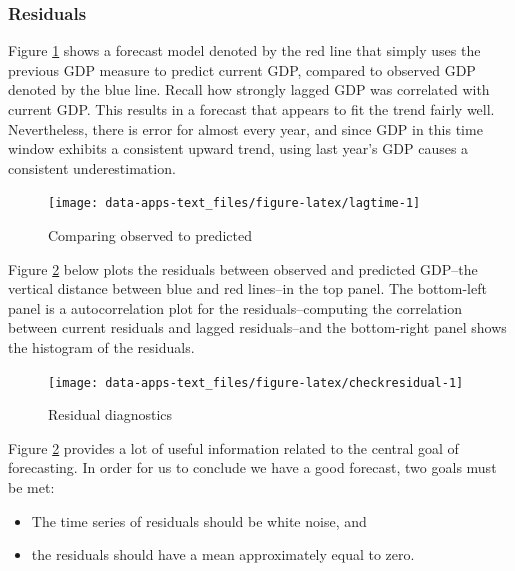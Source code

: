 \documentclass[
]{book}
\providecommand{\tightlist}{%
  \setlength{\itemsep}{0pt}\setlength{\parskip}{0pt}}
\begin{document}
\hypertarget{residuals}{%
\subsubsection*{Residuals}\label{residuals}}


Figure \ref{fig:lagtime} shows a forecast model denoted by the red line that simply uses the previous GDP measure to predict current GDP, compared to observed GDP denoted by the blue line. Recall how strongly lagged GDP was correlated with current GDP. This results in a forecast that appears to fit the trend fairly well. Nevertheless, there is error for almost every year, and since GDP in this time window exhibits a consistent upward trend, using last year's GDP causes a consistent underestimation.

\begin{figure}

{\centering \texttt{[image: data-apps-text\_files/figure-latex/lagtime-1]} 

}

\caption{Comparing observed to predicted}\label{fig:lagtime}
\end{figure}

Figure \ref{fig:checkresidual} below plots the residuals between observed and predicted GDP--the vertical distance between blue and red lines--in the top panel. The bottom-left panel is a autocorrelation plot for the residuals--computing the correlation between current residuals and lagged residuals--and the bottom-right panel shows the histogram of the residuals.

\begin{figure}

{\centering \texttt{[image: data-apps-text\_files/figure-latex/checkresidual-1]} 

}

\caption{Residual diagnostics}\label{fig:checkresidual}
\end{figure}

Figure \ref{fig:checkresidual} provides a lot of useful information related to the central goal of forecasting. In order for us to conclude we have a good forecast, two goals must be met:

\begin{itemize}
\tightlist
\item
  The time series of residuals should be white noise, and
\item
  the residuals should have a mean approximately equal to zero.
\end{itemize}
\end{document}
